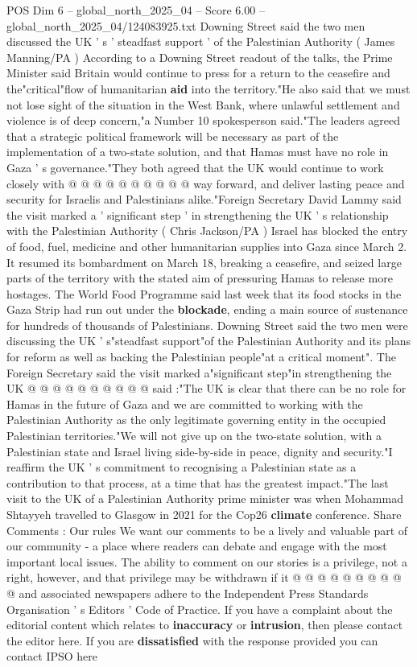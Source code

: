 \begin{textsample}{POS Dim 6 – global\_north\_2025\_04 – Score 6.00 – global\_north\_2025\_04/124083925.txt}
Downing Street said the two men discussed the UK ' s ' steadfast support ' of the Palestinian Authority ( James Manning/PA ) According to a Downing Street readout of the talks, the Prime Minister said Britain would continue to press for a return to the ceasefire and the"critical"flow of humanitarian \textbf{aid} into the territory."He also said that we must not lose sight of the situation in the West Bank, where unlawful settlement and violence is of deep concern,"a Number 10 spokesperson said."The leaders agreed that a strategic political framework will be necessary as part of the implementation of a two-state solution, and that Hamas must have no role in Gaza ' s governance."They both agreed that the UK would continue to work closely with @ @ @ @ @ @ @ @ @ @ way forward, and deliver lasting peace and security for Israelis and Palestinians alike."Foreign Secretary David Lammy said the visit marked a ' significant step ' in strengthening the UK ' s relationship with the Palestinian Authority ( Chris Jackson/PA ) Israel has blocked the entry of food, fuel, medicine and other humanitarian supplies into Gaza since March 2.
It resumed its bombardment on March 18, breaking a ceasefire, and seized large parts of the territory with the stated aim of pressuring Hamas to release more hostages.
The World Food Programme said last week that its food stocks in the Gaza Strip had run out under the \textbf{blockade}, ending a main source of sustenance for hundreds of thousands of Palestinians.
Downing Street said the two men were discussing the UK ' s"steadfast support"of the Palestinian Authority and its plans for reform as well as backing the Palestinian people"at a critical moment".
The Foreign Secretary said the visit marked a"significant step"in strengthening the UK @ @ @ @ @ @ @ @ @ @ said :"The UK is clear that there can be no role for Hamas in the future of Gaza and we are committed to working with the Palestinian Authority as the only legitimate governing entity in the occupied Palestinian territories."We will not give up on the two-state solution, with a Palestinian state and Israel living side-by-side in peace, dignity and security."I reaffirm the UK ' s commitment to recognising a Palestinian state as a contribution to that process, at a time that has the greatest impact."The last visit to the UK of a Palestinian Authority prime minister was when Mohammad Shtayyeh travelled to Glasgow in 2021 for the Cop26 \textbf{climate} conference.
Share Comments : Our rules We want our comments to be a lively and valuable part of our community - a place where readers can debate and engage with the most important local issues.
The ability to comment on our stories is a privilege, not a right, however, and that privilege may be withdrawn if it @ @ @ @ @ @ @ @ @ @ and associated newspapers adhere to the Independent Press Standards Organisation ' s Editors ' Code of Practice.
If you have a complaint about the editorial content which relates to \textbf{inaccuracy} or \textbf{intrusion}, then please contact the editor here.
If you are \textbf{dissatisfied} with the response provided you can contact IPSO here

\end{textsample}

